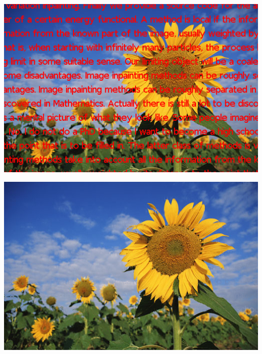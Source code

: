 \begin{frame}
{\begin{minipage}[t][0.25\textheight][t]{\textwidth}
\begin{minipage}{.3\textwidth}
\end{minipage}
\begin{minipage}{.3\textwidth}
\center
\includegraphics[scale=0.15]{figures/motivation/pock-sunflower-mask.png}
\end{minipage}
\begin{minipage}{.3\textwidth}
\center
\includegraphics[scale=0.15]{figures/motivation/pock-sunflower-inpainted.png}
\end{minipage}
\end{minipage}
}
%
\pause
%
\end{frame}
